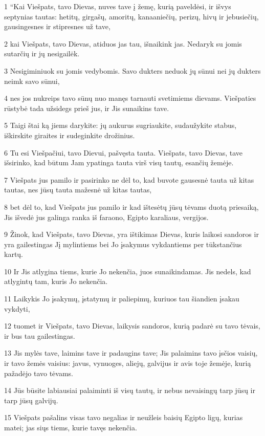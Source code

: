 \par 1 “Kai Viešpats, tavo Dievas, nuves tave į žemę, kurią paveldėsi, ir išvys septynias tautas: hetitų, girgašų, amoritų, kanaaniečių, perizų, hivų ir jebusiečių, gausingesnes ir stipresnes už tave, 
\par 2 kai Viešpats, tavo Dievas, atiduos jas tau, išnaikink jas. Nedaryk su jomis sutarčių ir jų nesigailėk. 
\par 3 Nesigiminiuok su jomis vedybomis. Savo dukters neduok jų sūnui nei jų dukters neimk savo sūnui, 
\par 4 nes jos nukreips tavo sūnų nuo manęs tarnauti svetimiems dievams. Viešpaties rūstybė tada užsidegs prieš jus, ir Jis sunaikins tave. 
\par 5 Taigi štai ką jiems darykite: jų aukurus sugriaukite, sudaužykite stabus, iškirskite giraites ir sudeginkite drožinius. 
\par 6 Tu esi Viešpačiui, tavo Dievui, pašvęsta tauta. Viešpats, tavo Dievas, tave išsirinko, kad būtum Jam ypatinga tauta virš visų tautų, esančių žemėje. 
\par 7 Viešpats jus pamilo ir pasirinko ne dėl to, kad buvote gausesnė tauta už kitas tautas, nes jūsų tauta mažesnė už kitas tautas, 
\par 8 bet dėl to, kad Viešpats jus pamilo ir kad ištesėtų jūsų tėvams duotą priesaiką, Jis išvedė jus galinga ranka iš faraono, Egipto karaliaus, vergijos. 
\par 9 Žinok, kad Viešpats, tavo Dievas, yra ištikimas Dievas, kuris laikosi sandoros ir yra gailestingas Jį mylintiems bei Jo įsakymus vykdantiems per tūkstančius kartų. 
\par 10 Ir Jis atlygina tiems, kurie Jo nekenčia, juos sunaikindamas. Jis nedels, kad atlygintų tam, kuris Jo nekenčia. 
\par 11 Laikykis Jo įsakymų, įstatymų ir paliepimų, kuriuos tau šiandien įsakau vykdyti, 
\par 12 tuomet ir Viešpats, tavo Dievas, laikysis sandoros, kurią padarė su tavo tėvais, ir bus tau gailestingas. 
\par 13 Jis mylės tave, laimins tave ir padaugins tave; Jis palaimins tavo įsčios vaisių, ir tavo žemės vaisius: javus, vynuoges, aliejų, galvijus ir avis toje žemėje, kurią pažadėjo tavo tėvams. 
\par 14 Jūs būsite labiausiai palaiminti iš visų tautų, ir nebus nevaisingų tarp jūsų ir tarp jūsų galvijų. 
\par 15 Viešpats pašalins visas tavo negalias ir neužleis baisių Egipto ligų, kurias matei; jas siųs tiems, kurie tavęs nekenčia. 
